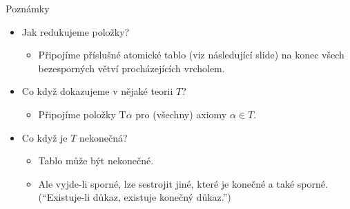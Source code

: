 \documentclass{beamer}
\begin{document}
\begin{frame}{Poznámky}

    \begin{itemize}[<+->]
        \item Jak redukujeme položky? \begin{itemize}
            \item Připojíme příslušné \alert{atomické tablo} (viz následující slide) na konec všech bezesporných větví procházejících vrcholem.
        \end{itemize}
        \item Co když dokazujeme v nějaké teorii $T$? \begin{itemize}
            \item Připojíme položky $\mathrm{T}\alpha$ pro (všechny) axiomy $\alpha\in T$.
        \end{itemize}
        \item Co když je $T$ nekonečná? \begin{itemize}
            \item Tablo může být nekonečné. 
            \item Ale vyjde-li sporné, lze sestrojit jiné, které je konečné a také sporné. (``Existuje-li důkaz, existuje konečný důkaz.'')
        \end{itemize}
    \end{itemize}

\end{frame}
\end{document}

